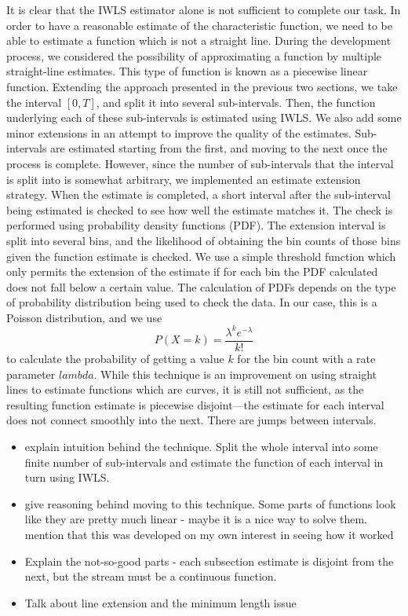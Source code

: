 \documentclass[a4paper,11pt]{article}
\begin{document}
It is clear that the IWLS estimator alone is not sufficient to complete our
task. In order to have a reasonable estimate of the characteristic function, we
need to be able to estimate a function which is not a straight line. During the
development process, we considered the possibility of approximating a function
by multiple straight-line estimates. This type of function is known as a
piecewise linear function. Extending the approach presented in the previous two
sections, we take the interval $[0,T]$, and split it into several
sub-intervals. Then, the function underlying each of these sub-intervals is
estimated using IWLS. We also add some minor extensions in an attempt to improve
the quality of the estimates. Sub-intervals are estimated starting from the
first, and moving to the next once the process is complete. However, since the
number of sub-intervals that the interval is split into is somewhat arbitrary,
we implemented an estimate extension strategy. When the estimate is completed, a
short interval after the sub-interval being estimated is checked to see how well
the estimate matches it. The check is performed using probability density
functions (PDF). The extension interval is split into several bins, and the
likelihood of obtaining the bin counts of those bins given the function estimate
is checked. We use a simple threshold function which only permits the extension
of the estimate if for each bin the PDF calculated does not fall below a certain
value. The calculation of PDFs depends on the type of probability distribution
being used to check the data. In our case, this is a Poisson distribution, and
we use
\begin{equation}
P(X=k)=\frac{\lambda^ke^{-\lambda}}{k!}
\end{equation}
to calculate the probability of getting a value $k$ for the bin count with a
rate parameter $lambda$. While this technique is an improvement on using
straight lines to estimate functions which are curves, it is still not
sufficient, as the resulting function estimate is piecewise disjoint---the
estimate for each interval does not connect smoothly into the next. There are
jumps between intervals.
\begin{itemize}
\item explain intuition behind the technique. Split the whole interval into some
  finite number of sub-intervals and estimate the function of each interval in
  turn using IWLS.
\item give reasoning behind moving to this technique. Some parts of functions look
  like they are pretty much linear - maybe it is a nice way to solve
  them. mention that this was developed on my own interest in seeing how it worked
\item Explain the not-so-good parts - each subsection estimate is disjoint from the
  next, but the stream must be a continuous function.
\item Talk about line extension and the minimum length issue
\end{itemize}
\end{document}
